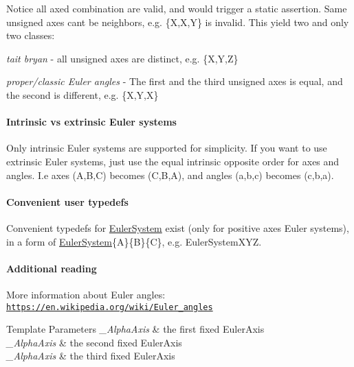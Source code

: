 Notice all axed combination are valid, and would trigger a static assertion. Same unsigned axes can\textquotesingle{}t be neighbors, e.\+g. \{X,X,Y\} is invalid. This yield two and only two classes\+:
\begin{DoxyItemize}
\item {\itshape tait bryan} -\/ all unsigned axes are distinct, e.\+g. \{X,Y,Z\}
\item {\itshape proper/classic Euler angles} -\/ The first and the third unsigned axes is equal, and the second is different, e.\+g. \{X,Y,X\}
\end{DoxyItemize}

\paragraph*{Intrinsic vs extrinsic Euler systems}

Only intrinsic Euler systems are supported for simplicity. If you want to use extrinsic Euler systems, just use the equal intrinsic opposite order for axes and angles. I.\+e axes (A,B,C) becomes (C,B,A), and angles (a,b,c) becomes (c,b,a).

\paragraph*{Convenient user typedefs}

Convenient typedefs for \hyperlink{class_eigen_1_1_euler_system}{Euler\+System} exist (only for positive axes Euler systems), in a form of \hyperlink{class_eigen_1_1_euler_system}{Euler\+System}\{A\}\{B\}\{C\}, e.\+g. Euler\+System\+X\+YZ.

\paragraph*{Additional reading}

More information about Euler angles\+: \href{https://en.wikipedia.org/wiki/Euler_angles}{\tt https\+://en.\+wikipedia.\+org/wiki/\+Euler\+\_\+angles}


\begin{DoxyTemplParams}{Template Parameters}
{\em \+\_\+\+Alpha\+Axis} & the first fixed Euler\+Axis\\
\hline
{\em \+\_\+\+Alpha\+Axis} & the second fixed Euler\+Axis\\
\hline
{\em \+\_\+\+Alpha\+Axis} & the third fixed Euler\+Axis \\
\hline
\end{DoxyTemplParams}


